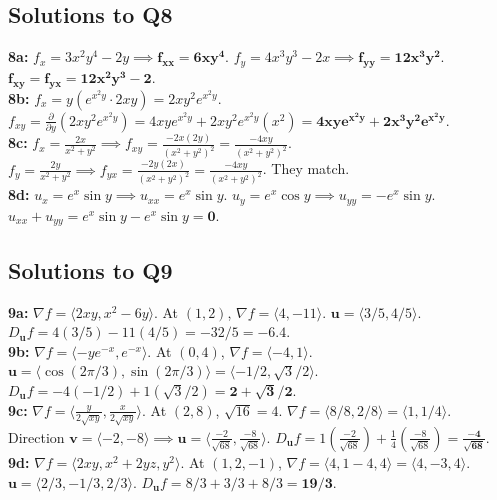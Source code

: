 \documentclass[11pt]{article}
\begin{document}
\subsection{Solutions to Q8}
\textbf{8a:} $f_x = 3x^2y^4 - 2y \implies \mathbf{f_{xx} = 6xy^4}$. $f_y = 4x^3y^3 - 2x \implies \mathbf{f_{yy} = 12x^3y^2}$. $\mathbf{f_{xy} = f_{yx} = 12x^2y^3 - 2}$.\\
\textbf{8b:} $f_x = y(e^{x^2y} \cdot 2xy) = 2xy^2e^{x^2y}$. $f_{xy} = \frac{\partial}{\partial y}(2xy^2e^{x^2y}) = 4xye^{x^2y} + 2xy^2e^{x^2y}(x^2) = \mathbf{4xye^{x^2y} + 2x^3y^2e^{x^2y}}$.\\
\textbf{8c:} $f_x = \frac{2x}{x^2+y^2} \implies f_{xy} = \frac{-2x(2y)}{(x^2+y^2)^2} = \frac{-4xy}{(x^2+y^2)^2}$. $f_y = \frac{2y}{x^2+y^2} \implies f_{yx} = \frac{-2y(2x)}{(x^2+y^2)^2} = \frac{-4xy}{(x^2+y^2)^2}$. They match.\\
\textbf{8d:} $u_x = e^x\sin y \implies u_{xx} = e^x\sin y$. $u_y = e^x\cos y \implies u_{yy} = -e^x\sin y$. $u_{xx} + u_{yy} = e^x\sin y - e^x\sin y = \mathbf{0}$.

\subsection{Solutions to Q9}
\textbf{9a:} $\nabla f = \langle 2xy, x^2 - 6y \rangle$. At $(1,2)$, $\nabla f = \langle 4, -11 \rangle$. $\mathbf{u} = \langle 3/5, 4/5 \rangle$. $D_{\mathbf{u}}f = 4(3/5) - 11(4/5) = -32/5 = \mathbf{-6.4}$.\\
\textbf{9b:} $\nabla f = \langle -ye^{-x}, e^{-x} \rangle$. At $(0,4)$, $\nabla f = \langle -4, 1 \rangle$. $\mathbf{u} = \langle \cos(2\pi/3), \sin(2\pi/3) \rangle = \langle -1/2, \sqrt{3}/2 \rangle$. $D_{\mathbf{u}}f = -4(-1/2) + 1(\sqrt{3}/2) = \mathbf{2 + \sqrt{3}/2}$.\\
\textbf{9c:} $\nabla f = \langle \frac{y}{2\sqrt{xy}}, \frac{x}{2\sqrt{xy}} \rangle$. At $(2,8)$, $\sqrt{16}=4$. $\nabla f = \langle 8/8, 2/8 \rangle = \langle 1, 1/4 \rangle$. Direction $\mathbf{v} = \langle -2, -8 \rangle \implies \mathbf{u} = \langle \frac{-2}{\sqrt{68}}, \frac{-8}{\sqrt{68}} \rangle$. $D_{\mathbf{u}}f = 1(\frac{-2}{\sqrt{68}}) + \frac{1}{4}(\frac{-8}{\sqrt{68}}) = \mathbf{\frac{-4}{\sqrt{68}}}$.\\
\textbf{9d:} $\nabla f = \langle 2xy, x^2+2yz, y^2 \rangle$. At $(1,2,-1)$, $\nabla f = \langle 4, 1-4, 4 \rangle = \langle 4, -3, 4 \rangle$. $\mathbf{u} = \langle 2/3, -1/3, 2/3 \rangle$. $D_{\mathbf{u}}f = 8/3 + 3/3 + 8/3 = \mathbf{19/3}$.
\end{document}

